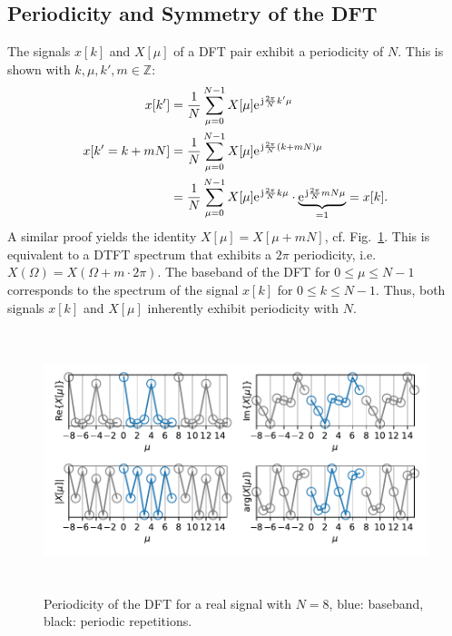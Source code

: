 \documentclass[11pt,a4paper,DIV=12]{scrartcl}
\begin{document}
\subsection{Periodicity and Symmetry of the DFT}
The signals $x[k]$ and $X[\mu]$ of a DFT pair exhibit a periodicity of $N$.
%
This is shown with $k,\mu,k',m\in\mathbb{Z}$:
\begin{align}
x[k']&=\frac{1}{N}\sum_{\mu=0}^{N-1}X[\mu]\e^{\im\frac{2\pi}{N}k'\mu}\\
x[k'=k+m N]&=\frac{1}{N}\sum_{\mu=0}^{N-1}X[\mu]\e^{\im\frac{2\pi}{N}(k+mN)\mu}\\
&=\frac{1}{N}\sum_{\mu=0}^{N-1}X[\mu]\e^{\im\frac{2\pi}{N}k\mu}\cdot\underbrace{\e^{\im\frac{2\pi}{N}mN\mu}}_{=1}=x[k].
\end{align}
%
A similar proof yields the identity $X[\mu]=X[\mu+mN]$, cf.
Fig.~\ref{Periodicity_DFT}.
%
This is equivalent to a DTFT spectrum that exhibits a $2\pi$ periodicity, i.e.
$X(\Omega)=X(\Omega+m\cdot2\pi)$.
%
The baseband of the DFT for $0\leq\mu\leq N-1$ corresponds to the spectrum of
the signal $x[k]$ for $0\leq k\leq N-1$.
%
Thus, both signals $x[k]$ and $X[\mu]$ inherently exhibit periodicity with $N$.
\begin{figure}[b!]
		\centering
		\includegraphics[width=6in, height=3in]{graphics/Periodicity_DFT.pdf}
		\caption{Periodicity of the DFT for a real signal with $N=8$,
		blue: baseband, black: periodic repetitions.}
		\label{Periodicity_DFT}
\end{figure}%
\end{document}
